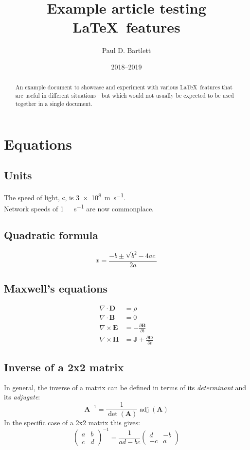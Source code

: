 \documentclass[11pt,a4paper]{article}
\title{Example article testing \LaTeX\ features}
\author{Paul D. Bartlett}
\date{2018--2019}
\begin{document}
\maketitle

\begin{abstract}
An example document to showcase and experiment with various \LaTeX\ features that
are useful in different situations---but which would not usually be expected to be used
together in a single document.
\end{abstract}

\tableofcontents
\listoftables
\listoffigures

\section{Equations}

\subsection{Units}
The speed of light, $c$, is \SI{3e8}{\metre\per\second}.\\
Network speeds of \SI[per-mode=symbol]{1}{\gibi\bit\per\second} are now commonplace.

\subsection{Quadratic formula}
\begin{equation}
x = \frac{-b \pm \sqrt{b^2 - 4ac}}{2a}
\end{equation}

\subsection{Maxwell's equations}
\begin{align}
\nabla \cdot \mathbf{D} &= \rho\\
\nabla \cdot \mathbf{B} &= 0\\
\nabla \times \mathbf{E} &= -\frac{\partial \mathbf{B}} {\partial t}\\
\nabla \times \mathbf{H} &= \mathbf{J} + \frac{\partial \mathbf{D}} {\partial t}
\end{align}

\subsection{Inverse of a 2x2 matrix}
In general, the inverse of a matrix can be defined in terms of its \textit{determinant}
and its \textit{adjugate}:
\begin{equation}
\mathbf{A}^{-1} = \frac{1}{\det(\mathbf{A})} \operatorname{adj}(\mathbf{A})
\end{equation}
In the specific case of a 2x2 matrix this gives:
\begin{equation}
\begin{pmatrix}
a & b\\
c & d
\end{pmatrix}^{-1}
=
\frac{1}{ad-bc}
\begin{pmatrix}
d & -b\\
-c & a
\end{pmatrix}
\end{equation}
\end{document}
